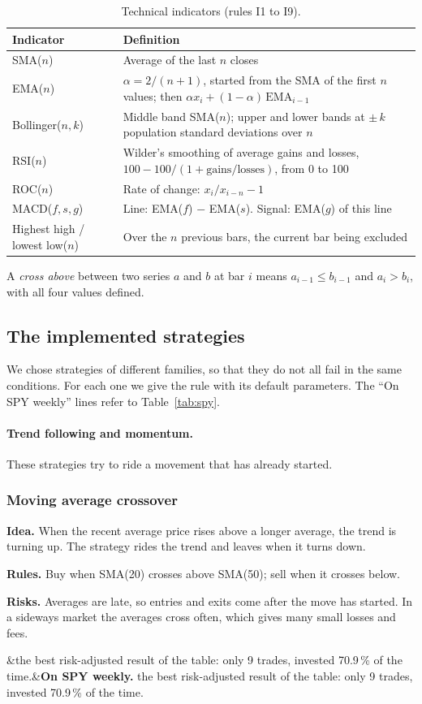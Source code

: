 \documentclass[11pt,a4paper]{article}
\newcommand{\strategy}[5]{%
\subsubsection*{#1}
\textbf{Idea.} #2\par
\textbf{Rules.} #3\par
\textbf{Risks.} #4\par
\ifx&#5&\else\textbf{On SPY weekly.} #5\par\fi}
\begin{document}
\begin{table}[H]
\centering\small
\begin{tabularx}{\textwidth}{lY}
\toprule
\textbf{Indicator} & \textbf{Definition} \\
\midrule
SMA($n$) & Average of the last $n$ closes \\
EMA($n$) & $\alpha = 2/(n+1)$, started from the SMA of the first $n$ values; then $\alpha x_i + (1-\alpha)\,\text{EMA}_{i-1}$ \\
Bollinger($n,k$) & Middle band SMA($n$); upper and lower bands at $\pm\, k$ population standard deviations over $n$ \\
RSI($n$) & Wilder's smoothing of average gains and losses, $100 - 100/(1+\text{gains}/\text{losses})$, from 0 to 100 \\
ROC($n$) & Rate of change: $x_i / x_{i-n} - 1$ \\
MACD($f,s,g$) & Line: EMA($f$) $-$ EMA($s$). Signal: EMA($g$) of this line \\
Highest high / lowest low($n$) & Over the $n$ previous bars, the current bar being excluded \\
\bottomrule
\end{tabularx}
\caption{Technical indicators (rules I1 to I9).}
\end{table}

A \textit{cross above} between two series $a$ and $b$ at bar $i$ means $a_{i-1} \leq b_{i-1}$ and $a_i > b_i$, with all four values defined.

\subsection{The implemented strategies}

We chose strategies of different families, so that they do not all fail in the same conditions. For each one we give the rule with its default parameters. The ``On SPY weekly'' lines refer to Table~\ref{tab:spy}.

\paragraph{Trend following and momentum.} These strategies try to ride a movement that has already started.

\strategy{Moving average crossover}
{When the recent average price rises above a longer average, the trend is turning up. The strategy rides the trend and leaves when it turns down.}
{Buy when SMA(20) crosses above SMA(50); sell when it crosses below.}
{Averages are late, so entries and exits come after the move has started. In a sideways market the averages cross often, which gives many small losses and fees.}
{the best risk-adjusted result of the table: only 9 trades, invested 70.9\,\% of the time.}
\end{document}
